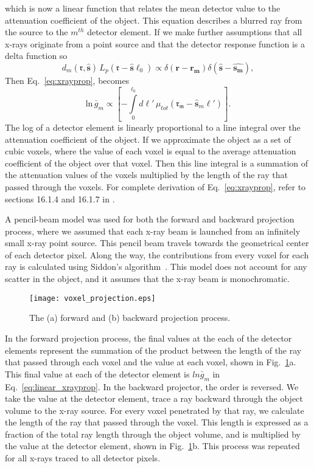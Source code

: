 %
which is now a linear function that relates the mean detector value to the attenuation coefficient of the object.  This equation describes a blurred ray from the source to the $m^{th}$ detector element.  If we make further assumptions that all x-rays originate from a point source and that the detector response function is a delta function so 
%
\begin{equation}
d_m(\mathbf{\mathfrak{r}}, \hat{\mathbf{s}}) \, L_p(\mathbf{\mathfrak{r}} - \hat{\mathbf{s}} \ell_0) \propto 
\delta(\mathbf{r} - \mathbf{r_m}) \delta(\hat{\mathbf{s}} - \hat{\mathbf{s_m}}),
\end{equation}
%
Then Eq.~\ref{eq:xrayprop}, becomes 
\begin{equation}
\label{eq:linear_xrayprop}
\mathrm{ln} \, \bar{g}_m \propto \left[ -\int\limits_0^{\ell_0} d\ell' \, \mu_{tot}(\mathbf{\mathfrak{r_m}} - \mathbf{\hat{s}}_m \ell') \right].
\end{equation}
%
The log of a detector element is linearly proportional to a line integral over the attenuation coefficient of the object.  If we approximate the object as a set of cubic voxels, where the value of each voxel is equal to the average attenuation coefficient of the object over that voxel.  Then this line integral is a summation of the attenuation values of the voxels multiplied by the length of the ray that passed through the voxels.  For complete derivation of Eq.~\ref{eq:xrayprop}, refer to sections 16.1.4 and 16.1.7 in \citep{Barrett2004}.

A pencil-beam model was used for both the forward and backward projection process, where we assumed that each x-ray beam is launched from an infinitely small x-ray point source. This pencil beam travels towards the geometrical center of each detector pixel.  Along the way, the contributions from every voxel for each ray is calculated using Siddon's algorithm~\citep{Siddon1985}.  This model does not account for any scatter in the object, and it assumes that the x-ray beam is monochromatic.
%
\begin{figure}[h]
\centering
\texttt{[image: voxel\_projection.eps]}
\caption{The (a) forward and (b) backward projection process.}
\label{fig:voxel_projection}
\end{figure}

In the forward projection process, the final values at the each of the detector elements represent the summation of the product between the length of the ray that passed through each voxel and the value at each voxel, shown in Fig.~\ref{fig:voxel_projection}a.  This final value at each of the detector element is $ln \bar{g}_m$ in Eq.~\ref{eq:linear_xrayprop}.  In the backward projector, the order is reversed. We take the value at the detector element, trace a ray backward through the object volume to the x-ray source.  For every voxel penetrated by that ray, we calculate the length of the ray that passed through the voxel.  This length is expressed as a fraction of the total ray length through the object volume, and is multiplied by the value at the detector element, shown in Fig.~\ref{fig:voxel_projection}b.  This process was repeated for all x-rays traced to all detector pixels.

